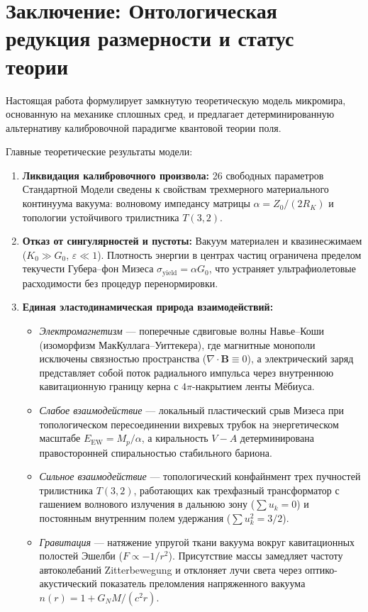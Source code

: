 \documentclass[11pt,a4paper]{article}
\theoremstyle{definition}
\theoremstyle{remark}
\begin{document}
\section{Заключение: Онтологическая редукция размерности и статус теории}

Настоящая работа формулирует замкнутую теоретическую модель микромира, основанную на механике сплошных сред, и предлагает детерминированную альтернативу калибровочной парадигме квантовой теории поля.

Главные теоретические результаты модели:
\begin{enumerate}
\item \textbf{Ликвидация калибровочного произвола:} 26 свободных параметров Стандартной Модели сведены к свойствам трехмерного материального континуума вакуума: волновому импедансу матрицы $\alpha = Z_0 / (2 R_K)$ и топологии устойчивого трилистника $T(3,2)$.
\item \textbf{Отказ от сингулярностей и пустоты:} Вакуум материален и квазинесжимаем ($K_0 \gg G_0$, $\varepsilon \ll 1$). Плотность энергии в центрах частиц ограничена пределом текучести Губера--фон Мизеса $\sigma_{\mathrm{yield}} = \alpha G_0$, что устраняет ультрафиолетовые расходимости без процедур перенормировки.
\item \textbf{Единая эластодинамическая природа взаимодействий:}
\begin{itemize}
\item \textit{Электромагнетизм} — поперечные сдвиговые волны Навье--Коши (изоморфизм МакКуллага--Уиттекера), где магнитные монополи исключены связностью пространства ($\nabla \cdot \mathbf{B} \equiv 0$), а электрический заряд представляет собой поток радиального импульса через внутреннюю кавитационную границу керна с $4\pi$-накрытием ленты Мёбиуса.
\item \textit{Слабое взаимодействие} — локальный пластический срыв Мизеса при топологическом пересоединении вихревых трубок на энергетическом масштабе $E_{\mathrm{EW}} = M_p / \alpha$, а киральность $V-A$ детерминирована правосторонней спиральностью стабильного бариона.
\item \textit{Сильное взаимодействие} — топологический конфайнмент трех пучностей трилистника $T(3,2)$, работающих как трехфазный трансформатор с гашением волнового излучения в дальнюю зону ($\sum u_k = 0$) и постоянным внутренним полем удержания ($\sum u_k^2 = 3/2$).
\item \textit{Гравитация} — натяжение упругой ткани вакуума вокруг кавитационных полостей Эшелби ($F \propto -1/r^2$). Присутствие массы замедляет частоту автоколебаний Zitterbewegung и отклоняет лучи света через оптико-акустический показатель преломления напряженного вакуума $n(r) = 1 + G_N M / (c^2 r)$.

\end{itemize}
\end{enumerate}
\end{document}
